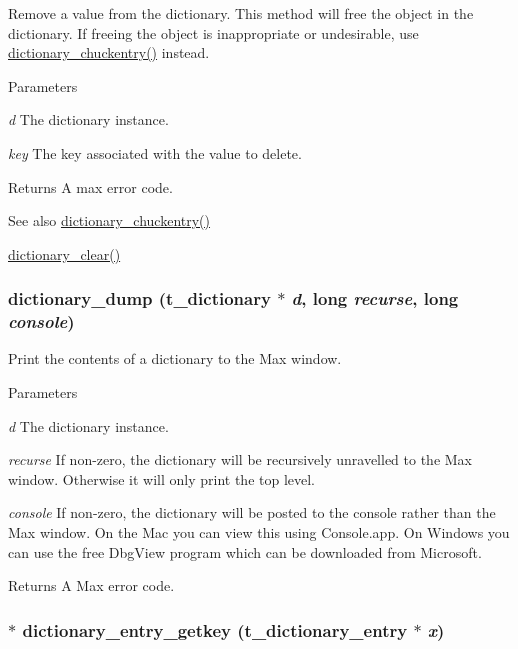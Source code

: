 Remove a value from the dictionary. This method will free the object in the dictionary. If freeing the object is inappropriate or undesirable, use \hyperlink{group__dictionary_gadac447ba3430cc2b8083d62df41932b8}{dictionary\_\-chuckentry()} instead.


\begin{DoxyParams}{Parameters}
\item[{\em d}]The dictionary instance. \item[{\em key}]The key associated with the value to delete. \end{DoxyParams}
\begin{DoxyReturn}{Returns}
A max error code.
\end{DoxyReturn}
\begin{DoxySeeAlso}{See also}
\hyperlink{group__dictionary_gadac447ba3430cc2b8083d62df41932b8}{dictionary\_\-chuckentry()} 

\hyperlink{group__dictionary_gafd9a85c38f7e6b1cd075664a5aa4cbc8}{dictionary\_\-clear()} 
\end{DoxySeeAlso}
\hypertarget{group__dictionary_ga099020753fc6918512d3bfc2b3fedafc}{
\subsubsection[{dictionary\_\-dump}]{ dictionary\_\-dump ({\bf t\_\-dictionary} $\ast$ {\em d}, \/  long {\em recurse}, \/  long {\em console})}}
\label{group__dictionary_ga099020753fc6918512d3bfc2b3fedafc}


Print the contents of a dictionary to the Max window. 
\begin{DoxyParams}{Parameters}
\item[{\em d}]The dictionary instance. \item[{\em recurse}]If non-\/zero, the dictionary will be recursively unravelled to the Max window. Otherwise it will only print the top level. \item[{\em console}]If non-\/zero, the dictionary will be posted to the console rather than the Max window. On the Mac you can view this using Console.app. On Windows you can use the free DbgView program which can be downloaded from Microsoft. \end{DoxyParams}
\begin{DoxyReturn}{Returns}
A Max error code. 
\end{DoxyReturn}
\hypertarget{group__dictionary_ga866aeb04d26740768790f64203f30b7c}{
\subsubsection[{dictionary\_\-entry\_\-getkey}]{$\ast$ dictionary\_\-entry\_\-getkey ({\bf t\_\-dictionary\_\-entry} $\ast$ {\em x})}}
\label{group__dictionary_ga866aeb04d26740768790f64203f30b7c}


